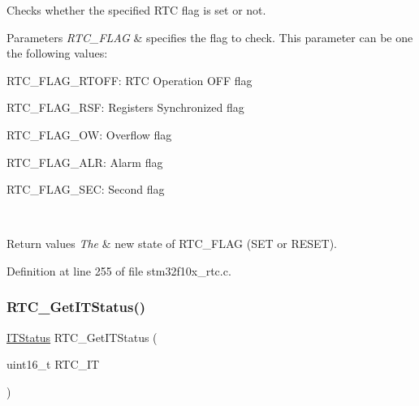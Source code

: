 Checks whether the specified R\+TC flag is set or not. 


\begin{DoxyParams}{Parameters}
{\em R\+T\+C\+\_\+\+F\+L\+AG} & specifies the flag to check. This parameter can be one the following values\+: \begin{DoxyItemize}
\item R\+T\+C\+\_\+\+F\+L\+A\+G\+\_\+\+R\+T\+O\+FF\+: R\+TC Operation O\+FF flag \item R\+T\+C\+\_\+\+F\+L\+A\+G\+\_\+\+R\+SF\+: Registers Synchronized flag \item R\+T\+C\+\_\+\+F\+L\+A\+G\+\_\+\+OW\+: Overflow flag \item R\+T\+C\+\_\+\+F\+L\+A\+G\+\_\+\+A\+LR\+: Alarm flag \item R\+T\+C\+\_\+\+F\+L\+A\+G\+\_\+\+S\+EC\+: Second flag \end{DoxyItemize}
\\
\hline
\end{DoxyParams}

\begin{DoxyRetVals}{Return values}
{\em The} & new state of R\+T\+C\+\_\+\+F\+L\+AG (S\+ET or R\+E\+S\+ET). \\
\hline
\end{DoxyRetVals}


Definition at line 255 of file stm32f10x\+\_\+rtc.\+c.

\mbox{\label{group___r_t_c___exported___functions_ga23274ad8aa28e86d5b0d58eee295db21}} 
\subsubsection{\texorpdfstring{R\+T\+C\+\_\+\+Get\+I\+T\+Status()}{RTC\_GetITStatus()}}
{\footnotesize\ttfamily \hyperlink{group___exported__types_gaacbd7ed539db0aacd973a0f6eca34074}{I\+T\+Status} R\+T\+C\+\_\+\+Get\+I\+T\+Status (\begin{DoxyParamCaption}\item[{uint16\+\_\+t}]{R\+T\+C\+\_\+\+IT }\end{DoxyParamCaption})}



